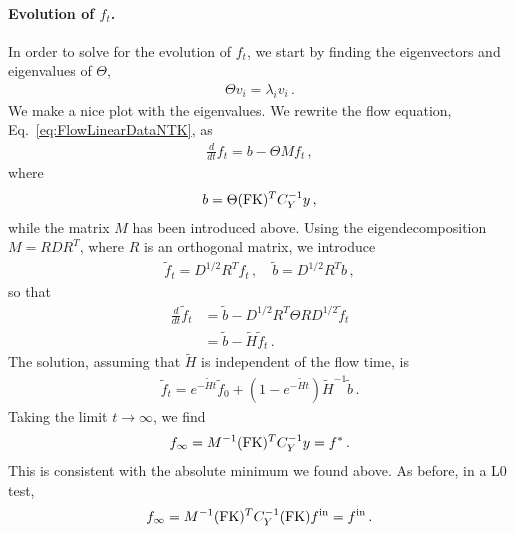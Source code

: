 \documentclass[11pt]{article}
\begin{document}
\paragraph{Evolution of $f_t$.}
In order to solve for the evolution of $f_t$, we start by finding the eigenvectors and eigenvalues of $\Theta$,
\begin{align}
    \label{eq:ThetaEigensystem}
    \Theta v_i = \lambda_i v_i\, .
\end{align}
We make a nice plot with the eigenvalues. We rewrite the flow equation,
Eq.~\ref{eq:FlowLinearDataNTK}, as
\begin{align}
    \frac{d}{dt} f_t = b - \Theta M f_t\, , 
\end{align}
where 
\begin{align}
    \label{eq:Defb}
    b = \Theta (\mathrm{FK})^T C_Y^{-1} y\, ,
\end{align}
while the matrix $M$ has been introduced above.  Using the eigendecomposition $M = R D R^T$, 
where $R$ is an orthogonal matrix, we introduce 
\begin{align}
    \label{eq:RotatedF}
    \tilde{f}_t = D^{1/2} R^T f_t\, , \quad \tilde{b} = D^{1/2} R^T b\, ,
\end{align}
so that 
\begin{align}
    \label{eq:EvolutionRotatedF}
    \frac{d}{dt} \tilde{f}_t &= \tilde{b} - D^{1/2} R^T \Theta R D^{1/2} \tilde{f}_t \\
        &= \tilde{b} - \tilde{H} \tilde{f}_t\, .
\end{align}
The solution, assuming that $\tilde{H}$ is independent of the flow time, is
\begin{align}
    \label{eq:FlowSolutionInFtilde}
    \tilde{f}_t = e^{-\tilde{H}t} \tilde{f}_0 + 
        \left(1 - e^{-\tilde{H}t}\right) \tilde{H}^{-1} \tilde{b}\, .
\end{align}
Taking the limit $t\to\infty$, we find
\begin{align}
    \label{eq:InfiniteTrainingF}
    f_\infty = M^{-1} (\mathrm{FK})^T C_Y^{-1} y = f^*\, .
\end{align}
This is consistent with the absolute minimum we found above. 
As before, in a L0 test, 
\begin{align}
    f_\infty = M^{-1} (\mathrm{FK})^T C_Y^{-1} (\mathrm{FK}) f^{\mathrm{in}} = f^{\mathrm{in}}\, .
\end{align}
\end{document}
